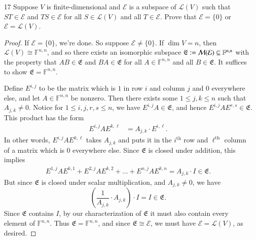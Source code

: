 \documentclass[11pt]{extarticle}
\newenvironment{problem}[1]{\begin{prob*}{#1}{}}{\end{prob*}}
\newcommand{\F}{\mathbb{F}}
\newcommand{\mat}{\mathcal{M}}
\newcommand{\Hom}{\mathcal{L}}
\newcommand{\defeq}{\vcentcolon=}
\begin{document}
\begin{problem}{17}
Suppose $V$ is finite-dimensional and $\mathcal{E}$ is a subspace of $\Hom(V)$ such that $ST\in\mathcal{E}$ and $TS \in\mathcal{E}$ for all $S\in\Hom(V)$ and all $T\in\mathcal{E}$.  Prove that $\mathcal{E}=\{0\}$ or $\mathcal{E}=\Hom(V)$.  
\end{problem}
\begin{proof}
If $\mathcal{E}=\{0\}$, we're done.  So suppose $\mathcal{E}\neq \{0\}$.  If $\dim V= n$, then $\Hom(V)\cong \F^{n,n}$, and so there exists an isomorphic subspace $\mathfrak{E}\defeq\mat(\mathcal{E})\subseteq\F^{n,n}$ with the property that $AB\in \mathfrak{E}$ and $BA\in \mathfrak{E}$ for all $A\in \F^{n,n}$ and all $B\in \mathfrak{E}$.  It suffices to show $\mathfrak{E} = \F^{n,n}$.  
\par  Define $E^{i,j}$ to be the matrix which is $1$ in row $i$ and column $j$ and $0$ everywhere else, and let $A\in\F^{n,n}$ be nonzero.  Then there exists some $1\leq j,k\leq n$ such that $A_{j,k}\neq 0$.  Notice for $1\leq i,j,r,s\leq n$, we have $E^{i,j}A\in \mathfrak{E}$, and hence $E^{i,j}AE^{r,s}\in\mathfrak{E}$. This product has the form
\begin{align*}
E^{i,j}AE^{k,\ell} &= A_{j,k}\cdot E^{i,\ell}.
\end{align*}
In other words, $E^{i,j}AE^{k,\ell}$ takes $A_{j,k}$ and puts it in the $i^{\text{th}}$ row and $\ell^{\text{th}}$ column of a matrix which is $0$ everywhere else.  Since $\mathfrak{E}$ is closed under addition, this implies
\begin{align*}
E^{1,j}AE^{k,1} + E^{2,j}AE^{k,2} + \dots +  E^{n,j}AE^{k,n} = A_{j,k}\cdot I\in \mathfrak{E}. 
\end{align*}
But since $\mathfrak{E}$ is closed under scalar multiplication, and $A_{j,k}\neq 0$, we have
\begin{equation*}
\left(\frac{1}{A_{j,k}}\cdot A_{j,k}\right) \cdot I = I \in \mathfrak{E}.
\end{equation*}
Since $\mathfrak{E}$ contains $I$, by our characterization of $\mathfrak{E}$ it must also contain every element of $\F^{n,n}$.  Thus $\mathfrak{E}=\F^{n,n}$, and since $\mathfrak{E}\cong \mathcal{E}$, we must have $\mathcal{E} = \Hom(V)$, as desired.
\end{proof}
\end{document}
